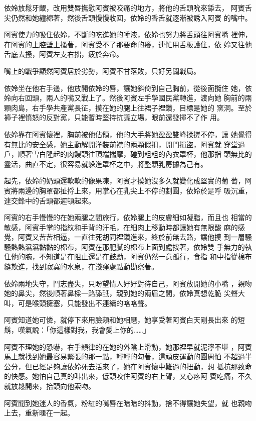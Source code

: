 依姈放鬆牙齦，改用雙唇撫慰阿賓被咬痛的地方，將他的舌頭吮來舔去，
阿賓舌尖仍然和她纏綿著，然後舌頭慢慢收回，依姈的香舌就逐漸被誘入阿賓
的嘴中。

阿賓使力的吸住依姈，不斷的吃進她的唾液，依姈也努力將舌頭往阿賓嘴
裡伸，在阿賓的上腔壁上搔著，阿賓受不了那要命的癢，連忙用舌板護住，依
姈又往他舌底去搔，阿賓左支右拙，疲於奔命。

嘴上的戰爭顯然阿賓居於劣勢，阿賓不甘落敗，只好另闢戰局。

依姈坐在他右手邊，他放開依姈的唇，讓她斜倚到自己胸前，從後面攬住
她，依姈向右回頭，兩人的嘴又戰上了。然後阿賓左手學國民黨轉進，渡向她
胸前的兩顆肉島，右手學共產黨長征，摸在她的腿上往裙子裡鑽，目標是她的
窯洞。至於褲子裡憤怒的反對黨，只能暫時堅持抗議立場，眼前還發揮不了作
用。

依姈靠在阿賓懷裡，胸前被他佔領，他的大手將她盈盈雙峰揉搓不停，讓
她覺得有無比的安全感，她主動解開洋裝前襟的兩顆假扣，開門揖盜，阿賓就
穿堂過戶，順著雪白隆起的肉饅頭往頂端揣摩，碰到粗粗的內衣罩杯，他那指
頭無比的靈活，曲直不定，很容易就躲進罩杯之中，將整顆乳房據為己有。

起先，依姈的奶頭還軟軟的像果凍，阿賓才摸她沒多久就變化成堅實的葡
萄，阿賓將兩邊的胸罩都扯捋上來，用掌心在乳尖上不停的劃圓，依姈於是呼
吸沉重，連交鋒中的舌頭都遲頓起來。

阿賓的右手慢慢的在她兩腿之間旅行，依姈腿上的皮膚細如凝脂，而且也
相當的敏感，阿賓手掌的指紋和手背的汗毛，在細肉上移動時都讓她有無限酸
麻的感覺，阿賓又苦苦相逼，一直往死胡同裡鑽進來，終於前無去路，讓他摸
到一層騷騷熱熱濕濕黏黏的棉布，阿賓在那肥膩的棉布上面到處按著，依姈雙
手無力的執住他的腕，不知道是在阻止還是在鼓勵，阿賓仍然一意孤行，食指
和中指從棉布縫欺進，找到寂寞的水泉，在淺窪處點動勘察著。

依姈兩地失守，鬥志盡失，只盼望情人好好對待自己，阿賓放開她的小嘴
，親吻她的鼻尖，然後順著鼻樑一路舔舐，親到她的兩眉之間，依姈真想乾脆
尖聲大叫，可是喉頭擁塞，只能發出不連續的咯咯聲。

阿賓知道她可憐，就停下來用臉頰和她相磨，她享受著阿賓白天剛長出來
的短鬍，嘆氣說：「你這樣對我，我會愛上你的……」

阿賓不理她的恐嚇，右手韻律的在她的外陰上滑動，她那裡早就泥濘不堪
，阿賓馬上就找到她最容易緊張的那一點，輕輕的勾著，這頑皮運動的圓周怕
不超過半公分，但已經足夠讓依姈死去活來了，她在阿賓懷中難過的扭動，想
抵抗那致命的快感。她怕自己真的叫出來，低頭咬住阿賓的右上臂，又心疼阿
賓吃痛，不久就放鬆開來，抬頭向他索吻。

阿賓聞到她迷人的香氣，粉紅的嘴唇在暗暗的抖動，捨不得讓她失望，就
也親吻上去，重新暱在一起。

